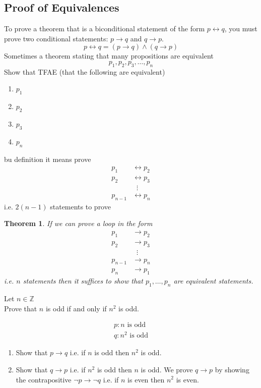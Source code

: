 \documentclass[a4paper, 12pt]{article}
\newtheorem{theorem}{Theorem}[section]
\newenvironment{proof}[1][Proof]{\begin{trivlist}
\item[\hskip \labelsep {\bfseries #1}]}{\end{trivlist}}
\newenvironment{example}[1][Example]{\begin{trivlist}
\item[\hskip \labelsep {\bfseries #1}]}{\end{trivlist}}
\newcommand{\then}{\rightarrow}
\newcommand{\bithen}{\leftrightarrow}
\begin{document}
    \subsection*{Proof of Equivalences}
    To prove a theorem that is a biconditional statement of the form $p \bithen q$,
    you must prove two conditional statements: $p \then q$ and $q \then p$.
    \[p \bithen q = (p \then q) \wedge (q \then p)\]
    Sometimes a theorem stating that many propositions are equivalent
    \[p_1, p_2, p_3, \dots, p_n\]
    Show that TFAE (that the following are equivalent)
    \begin{enumerate}
        \item $p_1$
        \item $p_2$
        \item $p_3$
        \item[n.] $p_n$
    \end{enumerate}
    bu definition it means prove
    \begin{align*}
        p_1 &\bithen p_2 \\
        p_2 &\bithen p_3 \\
        &\; \; \vdots \\
        p_{n-1} &\bithen p_n
    \end{align*}
    i.e. $2(n - 1)$ statements to prove
    \begin{theorem}
        If we can prove a loop in the form
        \begin{align*}
            p_1 &\then p_2 \\
            p_2 &\then p_3 \\
            &\; \; \vdots \\
            p_{n-1} &\then p_n \\
            p_{n} &\then p_1
        \end{align*}
        i.e. $n$ statements then it suffices to show that $p_1, \dots, p_n$
        are equivalent statements.
    \end{theorem}
    \begin{example}
        Let $n \in \mathbb{Z}$ \\
        Prove that $n$ is odd if and only if $n^2$ is odd.
        \begin{proof}
            \begin{align*}
                p: \text{$n$ is odd} \\
                q: \text{$n^2$ is odd}
            \end{align*}
        \end{proof}
        \begin{enumerate}
            \item Show that $p \then q$ i.e. if $n$ is odd then $n^2$ is odd.
            \item Show that $q \then p$ i.e. if $n^2$ is odd then $n$ is odd.
            We prove $q \then p$ by showing the contrapositive $\neg p \then \neg q$
            i.e. if $n$ is even then $n^2$ is even.
        \end{enumerate}
    \end{example}
\end{document}
